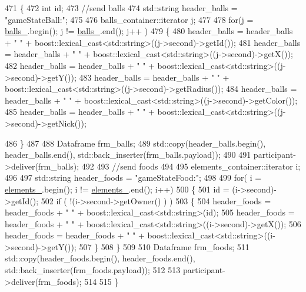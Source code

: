 \begin{DoxyCode}
471     \{
472         \textcolor{keywordtype}{int} id;
473         \textcolor{comment}{//send balls}
474         std::string header\_balls = \textcolor{stringliteral}{"gameStateBall:"};
475 
476         balls\_container::iterator j;
477 
478         \textcolor{keywordflow}{for}(j = \hyperlink{classwebsocket_1_1GameBoard_a8bdb65edb9742890aa150d5c7c5b7209}{balls\_}.begin(); j != \hyperlink{classwebsocket_1_1GameBoard_a8bdb65edb9742890aa150d5c7c5b7209}{balls\_}.end(); j++ )
479         \{
480             header\_balls = header\_balls + \textcolor{stringliteral}{" "} + boost::lexical\_cast<std::string>((j->second)->getId());
481             header\_balls = header\_balls + \textcolor{stringliteral}{" "} + boost::lexical\_cast<std::string>((j->second)->getX());
482             header\_balls = header\_balls + \textcolor{stringliteral}{" "} + boost::lexical\_cast<std::string>((j->second)->getY());
483             header\_balls = header\_balls + \textcolor{stringliteral}{" "} + boost::lexical\_cast<std::string>((j->second)->getRadius());
484             header\_balls = header\_balls + \textcolor{stringliteral}{" "} + boost::lexical\_cast<std::string>((j->second)->getColor()); 
485             header\_balls = header\_balls + \textcolor{stringliteral}{" "} + boost::lexical\_cast<std::string>((j->second)->getNick());  
         
486         \}
487 
488         Dataframe frm\_balls;
489         std::copy(header\_balls.begin(), header\_balls.end(), std::back\_inserter(frm\_balls.payload));
490 
491         participant->deliver(frm\_balls);
492         
493         \textcolor{comment}{//send foods}
494         
495         elements\_container::iterator i;
496         
497         std::string header\_foods = \textcolor{stringliteral}{"gameStateFood:"};
498 
499         \textcolor{keywordflow}{for}( i = \hyperlink{classwebsocket_1_1GameBoard_a56fd12d10af951e1f6a42a18f4ccfe35}{elements\_}.begin(); i != \hyperlink{classwebsocket_1_1GameBoard_a56fd12d10af951e1f6a42a18f4ccfe35}{elements\_}.end(); i++)
500         \{
501             \textcolor{keywordtype}{id} = (i->second)->getId();
502             \textcolor{keywordflow}{if} ( !(i->second->getOwner() ) )
503             \{
504                 header\_foods = header\_foods + \textcolor{stringliteral}{" "} + boost::lexical\_cast<std::string>(id);
505                 header\_foods = header\_foods + \textcolor{stringliteral}{" "} + boost::lexical\_cast<std::string>((i->second)->getX());
506                 header\_foods = header\_foods + \textcolor{stringliteral}{" "} + boost::lexical\_cast<std::string>((i->second)->getY());
507             \}
508         \}
509 
510         Dataframe frm\_foods;
511         std::copy(header\_foods.begin(), header\_foods.end(), std::back\_inserter(frm\_foods.payload));
512 
513         participant->deliver(frm\_foods);
514         
515     \}
\end{DoxyCode}

